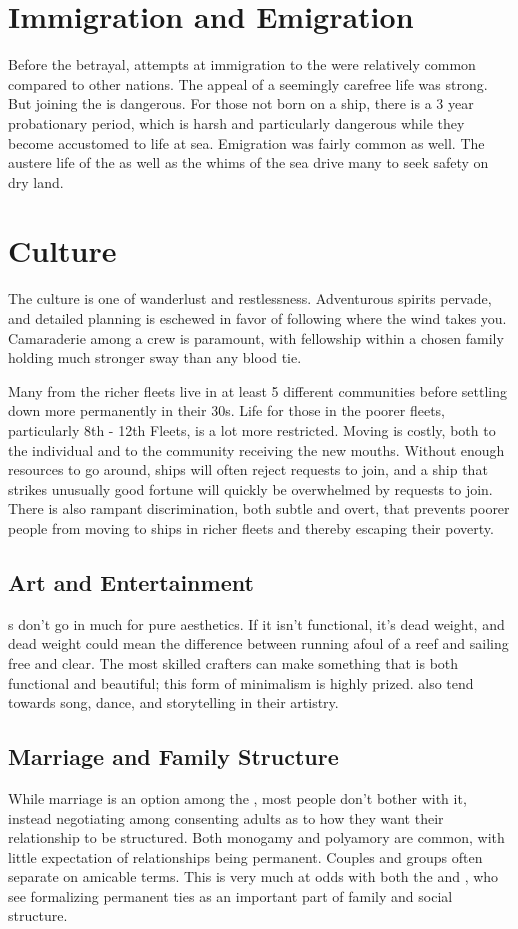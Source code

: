 \documentclass[blue]{GL2020}
\begin{document}
\section*{Immigration and Emigration}
Before the betrayal, attempts at immigration to the \pShip{} were relatively common compared to other nations. The appeal of a seemingly carefree life was strong. But joining the \pShippies{} is dangerous. For those not born on a ship, there is a 3 year probationary period, which is harsh and particularly dangerous while they become accustomed to life at sea. Emigration was fairly common as well. The austere life of the \pShip{} as well as the whims of the sea drive many to seek safety on dry land.

\section*{Culture}
The \pShip{} culture is one of wanderlust and restlessness. Adventurous spirits pervade, and detailed planning is eschewed in favor of following where the wind takes you. Camaraderie among a crew is paramount, with fellowship within a chosen family holding much stronger sway than any blood tie.

Many \pShippies{} from the richer fleets live in at least 5 different communities before settling down more permanently in their 30s. Life for those in the poorer fleets, particularly 8th - 12th Fleets, is a lot more restricted. Moving is costly, both to the individual and to the community receiving the new mouths. Without enough resources to go around, ships will often reject requests to join, and a ship that strikes unusually good fortune will quickly be overwhelmed by requests to join. There is also rampant discrimination, both subtle and overt, that prevents poorer people from moving to ships in richer fleets and thereby escaping their poverty.

\subsection*{Art and Entertainment}
\pShippies{}s don't go in much for pure aesthetics. If it isn't functional, it's dead weight, and dead weight could mean the difference between running afoul of a reef and sailing free and clear. The most skilled crafters can make something that is both functional and beautiful; this form of minimalism is highly prized. \pShippies{} also tend towards song, dance, and storytelling in their artistry.

\subsection*{Marriage and Family Structure}
While marriage is an option among the \pShippies{}, most people don't bother with it, instead negotiating among consenting adults as to how they want their relationship to be structured. Both monogamy and polyamory are common, with little expectation of relationships being permanent. Couples and groups often separate on amicable terms. This is very much at odds with both the \pTech{} and \pFarm{}, who see formalizing permanent ties as an important part of family and social structure.
\end{document}
